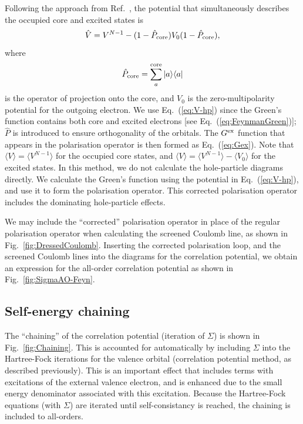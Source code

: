 \documentclass[10pt,twocolumn,a4paper]{article}%
\newcommand{\bra}[1]{\ensuremath{\langle #1|}}	%
\newcommand{\ket}[1]{\ensuremath{|#1\rangle}}	%
\newcommand{\braket}[1]{\ensuremath{\langle #1\rangle}}	%
\newcommand{\be}{\begin{equation}}
\newcommand{\ee}{\end{equation}}
\begin{document}
Following the approach from Ref.~\cite{DzubaCPM1989plaEn}, the potential that simultaneously describes the occupied core and excited states is
\be\label{eq:V-hp}
\hat V = V^{N-1} - (1-\hat P_{\rm core})V_0 (1-\hat P_{\rm core}),
\ee
where
\be
\hat P_{\rm core} = \sum_a^{\rm core}\ket{a}\bra{a}
\ee
is the operator of projection onto the core, and
 $V_0$ is the zero-multipolarity potential for the outgoing electron.
%
We use Eq.~(\ref{eq:V-hp}) since the Green's function contains both core and excited electrons [see Eq.~(\ref{eq:FeynmanGreen})]; $\hat P$ is introduced to ensure orthogonality of the orbitals.
The $G^{\rm ex}$ function that appears in the polarisation operator is then formed as Eq.~(\ref{eq:Gex}).
Note that $\braket{V}=\braket{V^{N-1}}$ for the occupied core states, and
$\braket{V}=\braket{V^{N-1}}-\braket{V_0}$ for the excited states.
In this method, we do not calculate the hole-particle diagrams directly.
We calculate the Green's function using the potential in Eq.~(\ref{eq:V-hp}), and use it to form the polarisation operator.
This corrected polarisation operator includes the dominating hole-particle effects.


We may include the ``corrected'' polarisation operator in place of the regular polarisation operator when calculating the screened Coulomb line, as shown in Fig.~\ref{fig:DressedCoulomb}.
Inserting the corrected polarisation loop, and the screened Coulomb lines into the diagrams for the correlation potential, we obtain an expression for the all-order correlation potential as shown in Fig.~\ref{fig:SigmaAO-Feyn}.







\subsection{Self-energy chaining}

The ``chaining'' of the correlation potential (iteration of $\Sigma$) is shown in Fig.~\ref{fig:Chaining}.
This is accounted for automatically by including $\Sigma$ into the Hartree-Fock iterations for the valence orbital (correlation potential method, as described previously).
This is an important effect that includes terms with excitations of the external valence electron, and is enhanced due to the small energy denominator associated with this excitation.
Because the Hartree-Fock equations (with $\Sigma$) are iterated until self-consistancy is reached, the chaining is included to all-orders.
\end{document}
